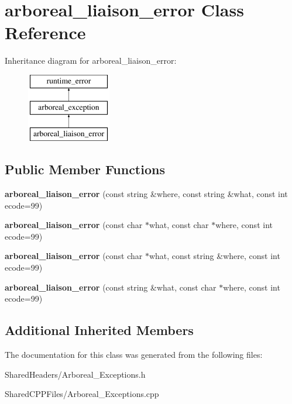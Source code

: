 \hypertarget{classarboreal__liaison__error}{}\section{arboreal\+\_\+liaison\+\_\+error Class Reference}
\label{classarboreal__liaison__error}
Inheritance diagram for arboreal\+\_\+liaison\+\_\+error\+:\begin{figure}[H]
\begin{center}
\leavevmode
\includegraphics[height=3.000000cm]{classarboreal__liaison__error}
\end{center}
\end{figure}
\subsection*{Public Member Functions}
\begin{DoxyCompactItemize}
\item 
\mbox{\label{classarboreal__liaison__error_af23c4a3672c9594e3382a05a1590abc4}} 
{\bfseries arboreal\+\_\+liaison\+\_\+error} (const string \&where, const string \&what, const int ecode=99)
\item 
\mbox{\label{classarboreal__liaison__error_ae9eaf00df34e37262348e254c6dad5ff}} 
{\bfseries arboreal\+\_\+liaison\+\_\+error} (const char $\ast$what, const char $\ast$where, const int ecode=99)
\item 
\mbox{\label{classarboreal__liaison__error_a593436824d649179f5c34b7311c56d2e}} 
{\bfseries arboreal\+\_\+liaison\+\_\+error} (const char $\ast$what, const string \&where, const int ecode=99)
\item 
\mbox{\label{classarboreal__liaison__error_a73221c813d25af214f19eaec704ffffd}} 
{\bfseries arboreal\+\_\+liaison\+\_\+error} (const string \&what, const char $\ast$where, const int ecode=99)
\end{DoxyCompactItemize}
\subsection*{Additional Inherited Members}


The documentation for this class was generated from the following files\+:\begin{DoxyCompactItemize}
\item 
Shared\+Headers/Arboreal\+\_\+\+Exceptions.\+h\item 
Shared\+C\+P\+P\+Files/Arboreal\+\_\+\+Exceptions.\+cpp\end{DoxyCompactItemize}
